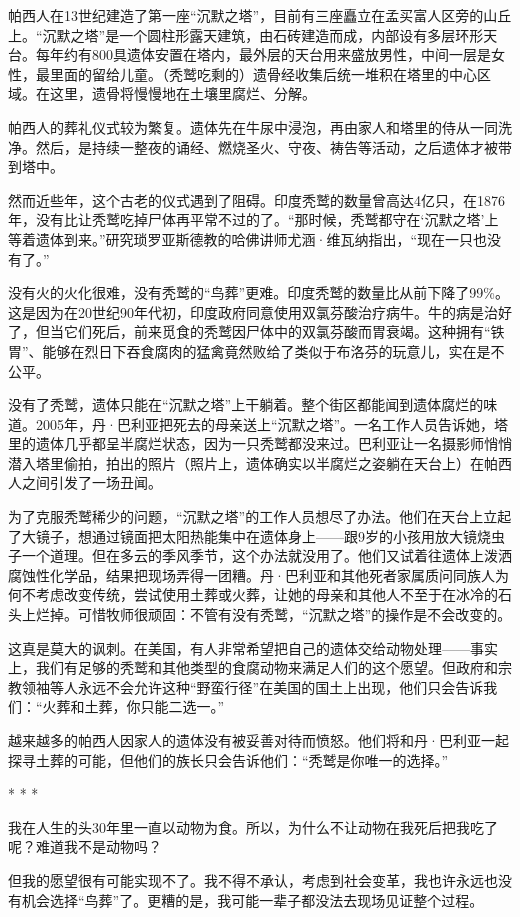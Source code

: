 \documentclass[12pt,oneside]{book}
\begin{document}
\begin{bookref}[frametitle={\cite{好好告别}}]
帕西人在13世纪建造了第一座“沉默之塔”，目前有三座矗立在孟买富人区旁的山丘上。“沉默之塔”是一个圆柱形露天建筑，由石砖建造而成，内部设有多层环形天台。每年约有800具遗体安置在塔内，最外层的天台用来盛放男性，中间一层是女性，最里面的留给儿童。（秃鹫吃剩的）遗骨经收集后统一堆积在塔里的中心区域。在这里，遗骨将慢慢地在土壤里腐烂、分解。

帕西人的葬礼仪式较为繁复。遗体先在牛尿中浸泡，再由家人和塔里的侍从一同洗净。然后，是持续一整夜的诵经、燃烧圣火、守夜、祷告等活动，之后遗体才被带到塔中。

然而近些年，这个古老的仪式遇到了阻碍。印度秃鹫的数量曾高达4亿只，在1876年，没有比让秃鹫吃掉尸体再平常不过的了。“那时候，秃鹫都守在‘沉默之塔’上等着遗体到来。”研究琐罗亚斯德教的哈佛讲师尤涵·维瓦纳指出，“现在一只也没有了。”

没有火的火化很难，没有秃鹫的“鸟葬”更难。印度秃鹫的数量比从前下降了99\%。这是因为在20世纪90年代初，印度政府同意使用双氯芬酸治疗病牛。牛的病是治好了，但当它们死后，前来觅食的秃鹫因尸体中的双氯芬酸而胃衰竭。这种拥有“铁胃”、能够在烈日下吞食腐肉的猛禽竟然败给了类似于布洛芬的玩意儿，实在是不公平。

没有了秃鹫，遗体只能在“沉默之塔”上干躺着。整个街区都能闻到遗体腐烂的味道。2005年，丹·巴利亚把死去的母亲送上“沉默之塔”。一名工作人员告诉她，塔里的遗体几乎都呈半腐烂状态，因为一只秃鹫都没来过。巴利亚让一名摄影师悄悄潜入塔里偷拍，拍出的照片（照片上，遗体确实以半腐烂之姿躺在天台上）在帕西人之间引发了一场丑闻。

为了克服秃鹫稀少的问题，“沉默之塔”的工作人员想尽了办法。他们在天台上立起了大镜子，想通过镜面把太阳热能集中在遗体身上——跟9岁的小孩用放大镜烧虫子一个道理。但在多云的季风季节，这个办法就没用了。他们又试着往遗体上泼洒腐蚀性化学品，结果把现场弄得一团糟。丹·巴利亚和其他死者家属质问同族人为何不考虑改变传统，尝试使用土葬或火葬，让她的母亲和其他人不至于在冰冷的石头上烂掉。可惜牧师很顽固：不管有没有秃鹫，“沉默之塔”的操作是不会改变的。

这真是莫大的讽刺。在美国，有人非常希望把自己的遗体交给动物处理——事实上，我们有足够的秃鹫和其他类型的食腐动物来满足人们的这个愿望。但政府和宗教领袖等人永远不会允许这种“野蛮行径”在美国的国土上出现，他们只会告诉我们：“火葬和土葬，你只能二选一。”

越来越多的帕西人因家人的遗体没有被妥善对待而愤怒。他们将和丹·巴利亚一起探寻土葬的可能，但他们的族长只会告诉他们：“秃鹫是你唯一的选择。”

\begin{center}
* * *
\end{center}
我在人生的头30年里一直以动物为食。所以，为什么不让动物在我死后把我吃了呢？难道我不是动物吗？

但我的愿望很有可能实现不了。我不得不承认，考虑到社会变革，我也许永远也没有机会选择“鸟葬”了。更糟的是，我可能一辈子都没法去现场见证整个过程。

\end{bookref}
\end{document}
